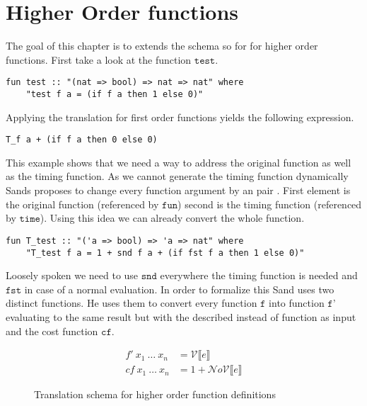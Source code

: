 
\section{Higher Order functions} \label{chapter:higher_order}

The goal of this chapter is to extends the schema so for for higher order functions.
First take a look at the function $\texttt{test}$.
\begin{lstlisting}[language=isabelle,mathescape=true]
  fun test :: "(nat => bool) => nat => nat" where
    "test f a = (if f a then 1 else 0)"
\end{lstlisting}
Applying the translation for first order functions yields the following expression.
\begin{lstlisting}[language=isabelle,mathescape=true]
  T_f a + (if f a then 0 else 0)
\end{lstlisting}

This example shows that we need a way to address the original function as well as the timing function.
As we cannot generate the timing function dynamically Sands proposes to change every function argument by an pair \parencite{sands}.
First element is the original function (referenced by $\texttt{fun}$) second is the timing function (referenced by $\texttt{time}$).
Using this idea we can already convert the whole function.
\begin{lstlisting}[language=isabelle,mathescape=true]
  fun T_test :: "('a => bool) => 'a => nat" where
    "T_test f a = 1 + snd f a + (if fst f a then 1 else 0)"
\end{lstlisting}
Loosely spoken we need to use $\texttt{snd}$ everywhere the timing function is needed and $\texttt{fst}$ in case of a normal evaluation.
In order to formalize this Sand uses two distinct functions.
He uses them to convert every function $\texttt{f}$ into function $\texttt{f'}$ evaluating to the same result but with the described instead of function as input and the cost function $\texttt{cf}$.
\begin{figure}
  \begin{align*}
  f'\ x_{1}\ \dots\ x_{n} &= \mathcal{V}\llbracket e \rrbracket \\
  cf\ x_{1}\ \dots\ x_{n} &= 1 + \mathcal{N}o\mathcal{V}\llbracket e \rrbracket
  \end{align*}
  \caption{Translation schema for higher order function definitions}
\end{figure}

